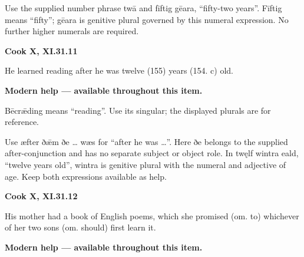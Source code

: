 Use the supplied number phrase twā and fīftig gēara, “fifty-two years”. Fīftig means “fifty”; gēara is genitive plural governed by this numeral expression. No further higher numerals are required.

\par\begin{minipage}{\linewidth}\raggedright
\textbf{Cook X, XI.31.11}

He learned reading after he was twelve (155) years (154. c) old.

\textbf{Modern help — available throughout this item.}

\end{minipage}\par\addvspace{4pt}

Bēcrǣding means “reading”. Use its singular; the displayed plurals are for reference.

Use æfter ðǣm ðe … wæs for “after he was …”. Here ðe belongs to the supplied after-conjunction and has no separate subject or object role. In twęlf wintra eald, “twelve years old”, wintra is genitive plural with the numeral and adjective of age. Keep both expressions available as help.

\par\begin{minipage}{\linewidth}\raggedright
\textbf{Cook X, XI.31.12}

His mother had a book of English poems, which she promised (om. to) whichever of her two sons (om. should) first learn it.

\textbf{Modern help — available throughout this item.}

\end{minipage}\par\addvspace{4pt}

